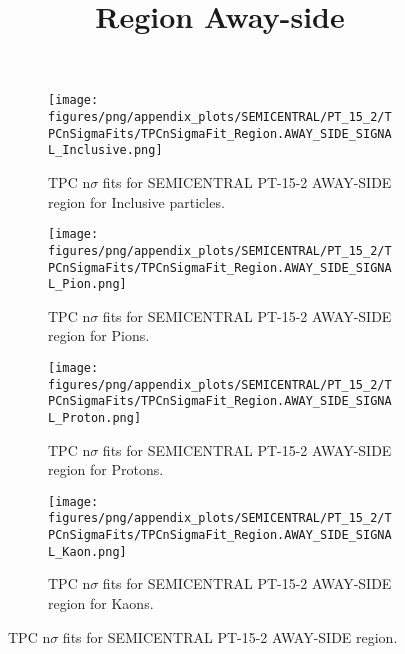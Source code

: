             \begin{figure}[H]
                \title{Region Away-side}
                \begin{subfigure}[b]{0.5\textwidth}
                    \centering
                    \texttt{[image: figures/png/appendix\_plots/SEMICENTRAL/PT\_15\_2/TPCnSigmaFits/TPCnSigmaFit\_Region.AWAY\_SIDE\_SIGNAL\_Inclusive.png]}
                    \caption{TPC n$\sigma$ fits for SEMICENTRAL PT-15-2 AWAY-SIDE region for Inclusive particles.}
                    \label{fig:appendix_SEMICENTRAL_PT-15-2_AWAY_SIDE_SIGNAL_Inclusive}
                \end{subfigure}
                \begin{subfigure}[b]{0.5\textwidth}
                    \centering
                    \texttt{[image: figures/png/appendix\_plots/SEMICENTRAL/PT\_15\_2/TPCnSigmaFits/TPCnSigmaFit\_Region.AWAY\_SIDE\_SIGNAL\_Pion.png]}
                    \caption{TPC n$\sigma$ fits for SEMICENTRAL PT-15-2 AWAY-SIDE region for Pions.}
                    \label{fig:appendix_SEMICENTRAL_PT-15-2_AWAY_SIDE_SIGNAL_Pion}
                \end{subfigure}
                \begin{subfigure}[b]{0.5\textwidth}
                    \centering
                    \texttt{[image: figures/png/appendix\_plots/SEMICENTRAL/PT\_15\_2/TPCnSigmaFits/TPCnSigmaFit\_Region.AWAY\_SIDE\_SIGNAL\_Proton.png]}
                    \caption{TPC n$\sigma$ fits for SEMICENTRAL PT-15-2 AWAY-SIDE region for Protons.}
                    \label{fig:appendix_SEMICENTRAL_PT-15-2_AWAY_SIDE_SIGNAL_Proton}
                \end{subfigure}
                \begin{subfigure}[b]{0.5\textwidth}
                    \centering
                    \texttt{[image: figures/png/appendix\_plots/SEMICENTRAL/PT\_15\_2/TPCnSigmaFits/TPCnSigmaFit\_Region.AWAY\_SIDE\_SIGNAL\_Kaon.png]}
                    \caption{TPC n$\sigma$ fits for SEMICENTRAL PT-15-2 AWAY-SIDE region for Kaons.}
                    \label{fig:appendix_SEMICENTRAL_PT-15-2_AWAY_SIDE_SIGNAL_Kaon}
                \end{subfigure}
                \caption{TPC n$\sigma$ fits for SEMICENTRAL PT-15-2 AWAY-SIDE region.}
                \label{fig:appendix_SEMICENTRAL_PT-15-2_AWAY_SIDE_SIGNAL}
            \end{figure}
